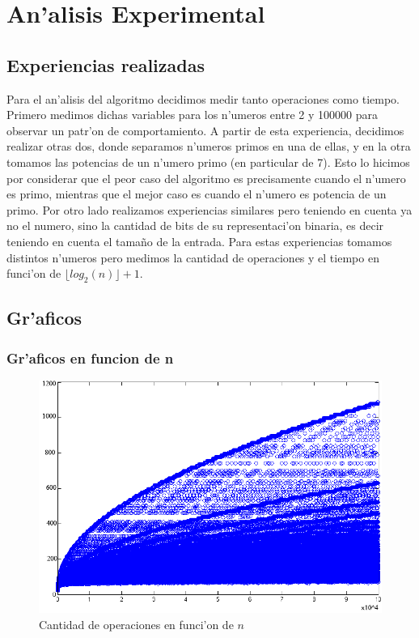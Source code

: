 \section{An'alisis Experimental}
\subsection{Experiencias realizadas}
Para el an'alisis del algoritmo decidimos medir tanto operaciones como tiempo. Primero medimos dichas variables 
para los n'umeros entre 2 y 100000 para observar un patr'on de comportamiento. A partir de esta experiencia, 
decidimos realizar otras dos, donde separamos n'umeros primos en una de ellas, y en la otra tomamos las potencias 
de un n'umero primo (en particular de 7). Esto lo hicimos por considerar que el peor caso del algoritmo es 
precisamente cuando el n'umero es primo, mientras que el mejor caso es cuando el n'umero es potencia de un primo. 
Por otro lado realizamos experiencias similares pero teniendo en cuenta ya no el numero, sino la cantidad de bits 
de su representaci'on binaria, es decir teniendo en cuenta el tama\~{n}o de la entrada. Para estas experiencias 
tomamos distintos n'umeros pero medimos la cantidad de operaciones y el tiempo en funci'on de $\lfloor log_2(n) \rfloor + 1$.

\subsection{Gr'aficos}
\subsubsection{Gr'aficos en funcion de n}

\begin{figure}[H]
\centering
\includegraphics[scale=0.7]{../../codigo/ejercicio1/benchmark/graficos/todos_los_numeros/graficosTodos.png}
\caption{Cantidad de operaciones en funci'on de $n$}
\end{figure}

